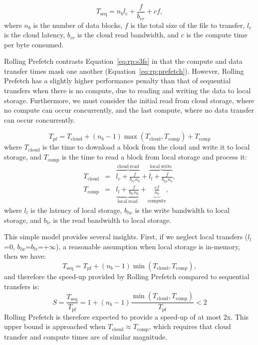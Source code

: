     \begin{equation}
T_{\mathrm{seq}} = n_{b}l_c + \frac{f}{b_{cr}} +  cf,
\label{eq:rp:s3fs}
\end{equation}
where $n_{b}$ is the number of data blocks, $f$ is the total size of the file to
transfer, $l_c$ is the cloud latency, $b_{cr}$ is the cloud read bandwidth, and
$c$ is the compute time per byte consumed.

Rolling Prefetch contrasts Equation~\ref{eq:rp:s3fs} in that the compute and data
transfer times mask one another (Equation~\ref{eq:rp:prefetch}). However, Rolling
Prefetch has a slightly higher performance penalty than that of sequential
transfers when there is no compute, due to reading and writing the data to local
storage. Furthermore, we must consider the initial read from cloud storage,
where no compute can occur concurrently, and the last compute, where no data
transfer can occur concurrently.

\begin{equation}
T_{\mathrm{pf}} = T_{\mathrm{cloud}} + (n_b-1)\max\left(T_{\mathrm{cloud}}, T_{\mathrm{comp}}\right) + T_{\mathrm{comp}} \label{eq:rp:prefetch}
\end{equation}
where $T_{\mathrm{cloud}}$ is the time to download a block from the cloud and
write it to local storage, and $T_{\mathrm{comp}}$ is the time to read a block
from local storage and process it:
\begin{eqnarray*}
T_{\mathrm{cloud}} &=& \overbrace{l_{c} + \frac{f}{b_{cr}n_{b}}}^{\mathrm{cloud\
read}} + \overbrace{l_{l} + \frac{f}{b_{lw}n_{b}}}^{\mathrm{local\ write}}, \\
T_{\mathrm{comp}} &=& \underbrace{l_l+\frac{f}{b_{lr}n_b}}_{\mathrm{local\
read}} + \underbrace{\frac{cf}{n_b}}_{\mathrm{compute}},
\end{eqnarray*}
where $l_l$ is the latency of local storage, $b_{lw}$ is the write bandwidth to
local storage, and $b_{lr}$ is the read bandwidth to local storage.

This simple model provides several insights. First, if we neglect local
transfers ($l_l$=0, $b_{lw}$=$b_{lr}$=+$\infty$), a reasonable assumption when
local storage is in-memory, then we have:
\begin{equation*}
T_{\mathrm{seq}} = T_{\mathrm{pf}} + (n_b-1)\min\left(T_{\mathrm{cloud}},T_{\mathrm{comp}}\right),
\end{equation*}
and therefore the speed-up provided by Rolling Prefetch compared to sequential
transfers is:
\begin{equation}
S=\frac{T_{\mathrm{seq}}}{T_{\mathrm{pf}}}=1+(n_b-1)\frac{\min\left(T_{\mathrm{cloud}},T_{\mathrm{comp}}\right)}{T_{\mathrm{pf}}} < 2 
\label{eq:rp:speed-up}
\end{equation}
Rolling Prefetch is therefore expected to provide a speed-up of at most 2x. This
upper bound is approached when $T_{\mathrm{cloud}} \approx T_{\mathrm{comp}}$,
which requires that cloud transfer and compute times are of similar magnitude.

